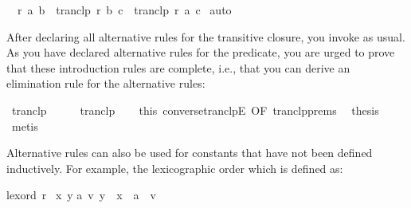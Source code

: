 \begin{isabellebody}
\ \ {}r\ a\ b\ {}\ tranclp\ r\ b\ c\ {}\ tranclp\ r\ a\ c{}\isanewline
{}\isamarkupfalse%
\ auto%
\endisatagquote
{\isafoldquote}%
%
\isadelimquote
%
\endisadelimquote
%
\begin{isamarkuptext}%
\noindent After declaring all alternative rules for the transitive
  closure, you invoke \hyperlink{command.code-pred}{\mbox{}} as usual.  As you have
  declared alternative rules for the predicate, you are urged to prove
  that these introduction rules are complete, i.e., that you can
  derive an elimination rule for the alternative rules:%
\end{isamarkuptext}%
\isamarkuptrue%
%
\isadelimquote
%
\endisadelimquote
%
\isatagquote
{}\isamarkupfalse%
\ tranclp\isanewline
{}\isamarkupfalse%
\ {}\isanewline
\ \ \isamarkupfalse%
\ tranclp\isanewline
\ \ \isamarkupfalse%
\ this\ converse{}tranclpE\ {}OF\ tranclp{}prems{}\ \isamarkupfalse%
\ thesis\ \isamarkupfalse%
\ metis\isanewline
{}\isamarkupfalse%
%
\endisatagquote
{\isafoldquote}%
%
\isadelimquote
%
\endisadelimquote
%
\begin{isamarkuptext}%
\noindent Alternative rules can also be used for constants that have
  not been defined inductively. For example, the lexicographic order
  which is defined as:%
\end{isamarkuptext}%
\isamarkuptrue%
%
\isadelimquote
%
\endisadelimquote
%
\isatagquote
%
\begin{isamarkuptext}%
\begin{isabelle}%
lexord\ r\ {}\isanewline
{}{}x{}\ y{}{}\isanewline
{}a\ v{}\ y\ {}\ x\ {}\ a\ {}\ v\ {}\isanewline

\end{isabelle}
\end{isamarkuptext}
\end{isabellebody}
